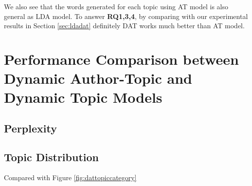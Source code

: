 We also see that the words generated for each topic using AT model is also general as LDA model. To answer \textbf{RQ1,3,4}, by comparing with our experimental results in Section \ref{sec:ldadat} definitely DAT works much better than AT model.


\section{Performance Comparison between Dynamic Author-Topic and Dynamic Topic Models}
\subsection{Perplexity}
\subsection{Topic Distribution}

Compared with Figure \ref{fig:dattopiccategory}

